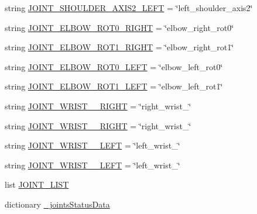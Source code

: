 \begin{DoxyCompactItemize}
\item 
string \mbox{\hyperlink{namespacesteering__capture__multiple__trajectories_a52b7ed9d7b0a88a43e563ea911e0cd86}{J\+O\+I\+N\+T\+\_\+\+S\+H\+O\+U\+L\+D\+E\+R\+\_\+\+A\+X\+I\+S2\+\_\+\+L\+E\+FT}} = \char`\"{}left\+\_\+shoulder\+\_\+axis2\char`\"{}
\item 
string \mbox{\hyperlink{namespacesteering__capture__multiple__trajectories_a243b724dd40651ba69fa9e8fc0d5f85c}{J\+O\+I\+N\+T\+\_\+\+E\+L\+B\+O\+W\+\_\+\+R\+O\+T0\+\_\+\+R\+I\+G\+HT}} = \char`\"{}elbow\+\_\+right\+\_\+rot0\char`\"{}
\item 
string \mbox{\hyperlink{namespacesteering__capture__multiple__trajectories_a9eb5ffcde390c34770314e0aa9bf43f5}{J\+O\+I\+N\+T\+\_\+\+E\+L\+B\+O\+W\+\_\+\+R\+O\+T1\+\_\+\+R\+I\+G\+HT}} = \char`\"{}elbow\+\_\+right\+\_\+rot1\char`\"{}
\item 
string \mbox{\hyperlink{namespacesteering__capture__multiple__trajectories_a692bf60961a4f8d1fc164671f0824eeb}{J\+O\+I\+N\+T\+\_\+\+E\+L\+B\+O\+W\+\_\+\+R\+O\+T0\+\_\+\+L\+E\+FT}} = \char`\"{}elbow\+\_\+left\+\_\+rot0\char`\"{}
\item 
string \mbox{\hyperlink{namespacesteering__capture__multiple__trajectories_afb54881a722eca416af2d2c71c5fd116}{J\+O\+I\+N\+T\+\_\+\+E\+L\+B\+O\+W\+\_\+\+R\+O\+T1\+\_\+\+L\+E\+FT}} = \char`\"{}elbow\+\_\+left\+\_\+rot1\char`\"{}
\item 
string \mbox{\hyperlink{namespacesteering__capture__multiple__trajectories_aaad0ed1220b3c6e8013d43d4ce0d95da}{J\+O\+I\+N\+T\+\_\+\+W\+R\+I\+S\+T\+\_\+\_\+\+R\+I\+G\+HT}} = \char`\"{}right\+\_\+wrist\+\_\char`\"{}
\item 
string \mbox{\hyperlink{namespacesteering__capture__multiple__trajectories_a3fcdafb9f250aa577293dbba67316f7c}{J\+O\+I\+N\+T\+\_\+\+W\+R\+I\+S\+T\+\_\+\_\+\+R\+I\+G\+HT}} = \char`\"{}right\+\_\+wrist\+\_\char`\"{}
\item 
string \mbox{\hyperlink{namespacesteering__capture__multiple__trajectories_a8a7c69c5d7d4b536204b270ad9852c93}{J\+O\+I\+N\+T\+\_\+\+W\+R\+I\+S\+T\+\_\+\_\+\+L\+E\+FT}} = \char`\"{}left\+\_\+wrist\+\_\char`\"{}
\item 
string \mbox{\hyperlink{namespacesteering__capture__multiple__trajectories_a8538783d0544a956ef595b6ba0cd959f}{J\+O\+I\+N\+T\+\_\+\+W\+R\+I\+S\+T\+\_\+\_\+\+L\+E\+FT}} = \char`\"{}left\+\_\+wrist\+\_\char`\"{}
\item 
list \mbox{\hyperlink{namespacesteering__capture__multiple__trajectories_a13591e1f833cc2fae5dd12507dd649d7}{J\+O\+I\+N\+T\+\_\+\+L\+I\+ST}}
\item 
dictionary \mbox{\hyperlink{namespacesteering__capture__multiple__trajectories_a864742365101fcf47fb999bbf9d6720c}{\+\_\+joints\+Status\+Data}}
\end{DoxyCompactItemize}


